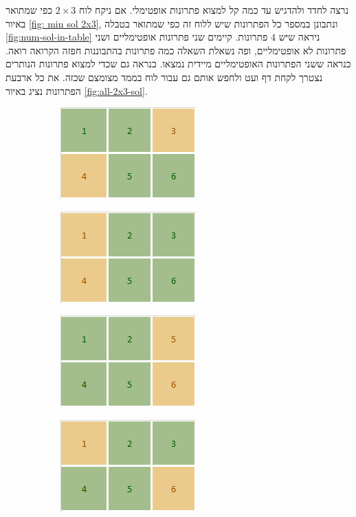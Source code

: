 \documentclass[12pt,leqno]{article}
\theoremstyle{theoremdd}
\begin{document}
נרצה לחדד ולהדגיש עד כמה קל למצוא פתרונות אופטימלי.
אם ניקח לוח 
$2 \times 3$
כפי שמתואר 
באיור 
\ref{fig: min sol 2x3},
ונתבונן במספר כל הפתרונות שיש ללוח זה
כפי
שמתואר בטבלה 
\ref{fig:num-sol-in-table}
ניראה שיש 
$4$
פתרונות.
קיימים שני פתרונות אופטימליים 
ושני פתרונות לא אופטימליים,
ופה נשאלת השאלה כמה פתרונות בהתבוננות חפזה הקרואה רואה.
כנראה ששני הפתרונות האופטימליים מיידית נמצאו. כנראה גם שכדי למצוא פתרונות הנותרים 
נצטרך לקחת דף ועט ולחפש אותם גם עבור לוח בממד מצומצם שכזה.
את כל ארבעת הפתרונות נציג באיור 
\ref{fig:all-2x3-sol}.

\begin{figure}[ht]
    \caption{משחק על גרף לדוגמה}
    \label{fig:all-2x3-sol}
    \centering
    \begin{subfigure}{.20\textwidth}
        \centering
        \includegraphics{images/min_sol_2x3.PNG}
    \end{subfigure}%
    \begin{subfigure}{.20\textwidth}
        \centering
        \includegraphics{images/2x3_2.png}
    \end{subfigure}%
    \begin{subfigure}{.20\textwidth}
        \centering
        \includegraphics{images/2x3_3.png}
    \end{subfigure}%
    \begin{subfigure}{.20\textwidth}
        \centering
        \includegraphics{images/2x3_4.png}
    \end{subfigure}%
\end{figure}
\end{document}
